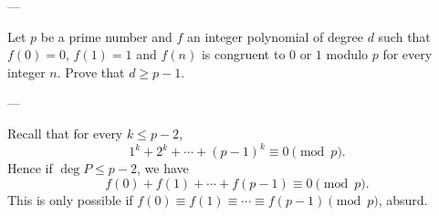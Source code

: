 
---

Let $p$ be a prime number and $f$ an integer polynomial of degree $d$ such that $f(0)=0$, $f(1)=1$ and $f(n)$ is congruent to $0$ or $1$ modulo $p$ for every integer $n$. Prove that $d\ge p-1$.

---

Recall that for every $k\le p-2$,
\[1^k+2^k+\cdots+(p-1)^k\equiv0\pmod p.\]
Hence if $\deg P\le p-2$, we have
\[f(0)+f(1)+\cdots+f(p-1)\equiv0\pmod p.\]
This is only possible if $f(0)\equiv f(1)\equiv\cdots\equiv f(p-1)\pmod p$, absurd.
